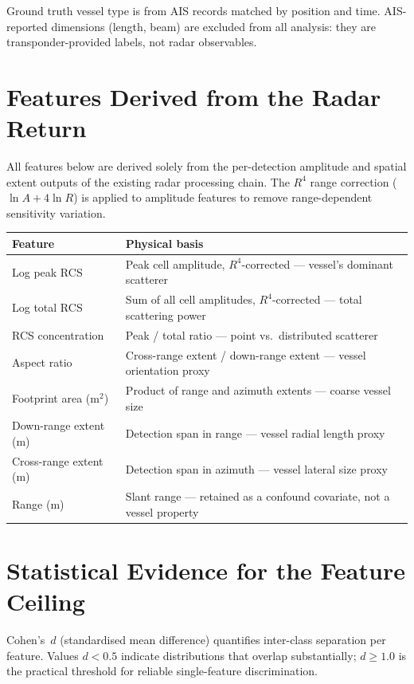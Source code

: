 \documentclass[10.5pt,a4paper]{article}
\begin{document}
Ground truth vessel type is from AIS records matched by position and time.
AIS-reported dimensions (length, beam) are excluded from all analysis: they are
transponder-provided labels, not radar observables.

\section{Features Derived from the Radar Return}

All features below are derived solely from the per-detection amplitude and spatial
extent outputs of the existing radar processing chain. The $R^{4}$ range correction
($\ln A + 4\ln R$) is applied to amplitude features to remove range-dependent
sensitivity variation.

\begin{center}\small
\begin{tabular}{ll}
\toprule
Feature & Physical basis \\
\midrule
Log peak RCS & Peak cell amplitude, $R^4$-corrected — vessel's dominant scatterer \\
Log total RCS & Sum of all cell amplitudes, $R^4$-corrected — total scattering power \\
RCS concentration & Peak / total ratio — point vs.\ distributed scatterer \\
Aspect ratio & Cross-range extent / down-range extent — vessel orientation proxy \\
Footprint area (m$^2$) & Product of range and azimuth extents — coarse vessel size \\
Down-range extent (m) & Detection span in range — vessel radial length proxy \\
Cross-range extent (m) & Detection span in azimuth — vessel lateral size proxy \\
Range (m) & Slant range — retained as a confound covariate, not a vessel property \\
\bottomrule
\end{tabular}
\end{center}

\section{Statistical Evidence for the Feature Ceiling}

Cohen's~$d$ (standardised mean difference) quantifies inter-class separation per
feature. Values $d < 0.5$ indicate distributions that overlap substantially;
$d \geq 1.0$ is the practical threshold for reliable single-feature discrimination.
\end{document}
